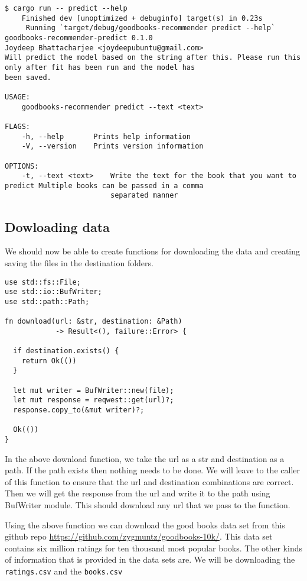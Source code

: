 \documentclass{book}
\begin{document}
\begin{lstlisting}[caption={}, basicstyle=\tiny]
$ cargo run -- predict --help
    Finished dev [unoptimized + debuginfo] target(s) in 0.23s
     Running `target/debug/goodbooks-recommender predict --help`
goodbooks-recommender-predict 0.1.0
Joydeep Bhattacharjee <joydeepubuntu@gmail.com>
Will predict the model based on the string after this. Please run this only after fit has been run and the model has
been saved.

USAGE:
    goodbooks-recommender predict --text <text>

FLAGS:
    -h, --help       Prints help information
    -V, --version    Prints version information

OPTIONS:
    -t, --text <text>    Write the text for the book that you want to predict Multiple books can be passed in a comma
                         separated manner
\end{lstlisting}
\label{sub:Command line}

\subsection{Dowloading data}%
We should now be able to create functions for downloading the data and creating saving the files in the destination folders.

\begin{lstlisting}[caption={chapter7/goodbooks-recommender/Cargo.toml}, basicstyle=\small]
use std::fs::File;
use std::io::BufWriter;
use std::path::Path;

fn download(url: &str, destination: &Path)
            -> Result<(), failure::Error> {

  if destination.exists() {
    return Ok(())
  }

  let mut writer = BufWriter::new(file);
  let mut response = reqwest::get(url)?;
  response.copy_to(&mut writer)?;

  Ok(())
}
\end{lstlisting}

In the above download function, we take the url as a str and destination as a path. If the path exists then nothing needs to be done. We will leave to the caller of this function to ensure that the url and destination combinations are correct. Then we will get the response from the url and write it to the path using BufWriter module. This should download any url that we pass to the function.

Using the above function we can download the good books data set from this github repo \href{}{https://github.com/zygmuntz/goodbooks-10k/}. This data set contains six million ratings for ten thousand most popular books. The other kinds of information that is provided in the data sets are. We will be downloading the \lstinline{ratings.csv} and the \lstinline{books.csv}
\end{document}
